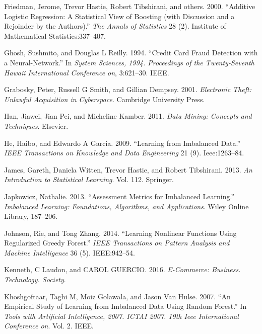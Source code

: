 \documentclass[12pt,]{article}
\begin{document}
\leavevmode\hypertarget{ref-friedman2000additive}{}%
Friedman, Jerome, Trevor Hastie, Robert Tibshirani, and others. 2000.
``Additive Logistic Regression: A Statistical View of Boosting (with
Discussion and a Rejoinder by the Authors).'' \emph{The Annals of
Statistics} 28 (2). Institute of Mathematical Statistics:337--407.

\leavevmode\hypertarget{ref-ghosh1994credit}{}%
Ghosh, Sushmito, and Douglas L Reilly. 1994. ``Credit Card Fraud
Detection with a Neural-Network.'' In \emph{System Sciences, 1994.
Proceedings of the Twenty-Seventh Hawaii International Conference on},
3:621--30. IEEE.

\leavevmode\hypertarget{ref-grabosky2001electronic}{}%
Grabosky, Peter, Russell G Smith, and Gillian Dempsey. 2001.
\emph{Electronic Theft: Unlawful Acquisition in Cyberspace}. Cambridge
University Press.

\leavevmode\hypertarget{ref-han2011data}{}%
Han, Jiawei, Jian Pei, and Micheline Kamber. 2011. \emph{Data Mining:
Concepts and Techniques}. Elsevier.

\leavevmode\hypertarget{ref-he2009learning}{}%
He, Haibo, and Edwardo A Garcia. 2009. ``Learning from Imbalanced
Data.'' \emph{IEEE Transactions on Knowledge and Data Engineering} 21
(9). Ieee:1263--84.

\leavevmode\hypertarget{ref-james2013introduction}{}%
James, Gareth, Daniela Witten, Trevor Hastie, and Robert Tibshirani.
2013. \emph{An Introduction to Statistical Learning}. Vol. 112.
Springer.

\leavevmode\hypertarget{ref-japkowicz2013assessment}{}%
Japkowicz, Nathalie. 2013. ``Assessment Metrics for Imbalanced
Learning.'' \emph{Imbalanced Learning: Foundations, Algorithms, and
Applications}. Wiley Online Library, 187--206.

\leavevmode\hypertarget{ref-johnson2014learning}{}%
Johnson, Rie, and Tong Zhang. 2014. ``Learning Nonlinear Functions Using
Regularized Greedy Forest.'' \emph{IEEE Transactions on Pattern Analysis
and Machine Intelligence} 36 (5). IEEE:942--54.

\leavevmode\hypertarget{ref-kenneth2016commerce}{}%
Kenneth, C Laudon, and CAROL GUERCIO. 2016. \emph{E-Commerce: Business.
Technology. Society}.

\leavevmode\hypertarget{ref-khoshgoftaar2007empirical}{}%
Khoshgoftaar, Taghi M, Moiz Golawala, and Jason Van Hulse. 2007. ``An
Empirical Study of Learning from Imbalanced Data Using Random Forest.''
In \emph{Tools with Artificial Intelligence, 2007. ICTAI 2007. 19th Ieee
International Conference on}. Vol. 2. IEEE.
\end{document}
